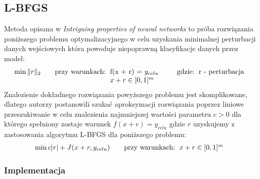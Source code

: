 \documentclass{article}
\begin{document}
\subsection{L-BFGS}
Metoda opisana w \textit{Intriguing properties of neural networks}\cite{DBLP:journals/corr/SzegedyZSBEGF13}
to próba rozwiązania poniższego problemu optymalizacyjnego w celu uzyskania minimalnej perturbacji danych wejściowych
która powoduje niepoprawną klasyfikacje danych przez model:
    \begin{equation}
    \min{\| r\|_{2}}
    \qquad\text{przy warunkach:}
    \begin{tabular}[t]{ll}
    f(x + r) = $y_{celu}$ \\
    $x+r \in [0,1]^{m}$ \\
    \end{tabular}
    \qquad\text{gdzie:}
    \begin{tabular}[t]{ll}
    r - perturbacja \\
    \end{tabular}
    \end{equation}
Znalezienie dokładnego rozwiązania powyższego problemu jest skomplikowane, dlatego autorzy postanowili szukać aproksymacji
rozwiązania poprzez liniowe przeszukiwanie w celu znalezienia najmniejszej wartości parametru $c > 0$ dla którego spełniony
zostaje warunek $f(x+r) = y_{celu}$ gdzie $r$ uzyskujemy z zastosowania algorytmu L-BFGS dla poniższego problemu:
    \begin{equation}
    \min{c| r| + J(x+r, y_{celu})}
    \qquad\text{przy warunkach:}
    \begin{tabular}[t]{ll}
    $x+r \in [0,1]^{m}$ \\
    \end{tabular}
    \end{equation}

\subsubsection{Implementacja}
\end{document}
